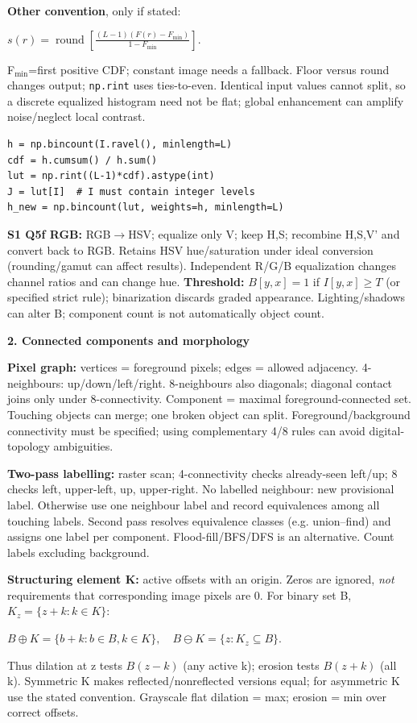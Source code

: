 \documentclass[a4paper]{article}
\newcommand{\key}[1]{\textbf{#1}}
\newcommand{\Topic}[1]{\par\vspace{1.7pt}\noindent
  {\fontsize{7.7}{8.0}\selectfont\bfseries #1}\par\vspace{0.3pt}}
\newcommand{\eq}[1]{\par\noindent\mbox{\(\displaystyle #1\)}\par}
\newcounter{sheet}
\newcounter{sheetcolumn}
\newlength{\colwidth}
\newenvironment{sheetcol}[1][7.0]{\stepcounter{sheetcolumn}
  \begin{lrbox}{\columnbox}\begin{minipage}[t]{\colwidth}\vspace{0pt}
  \fontsize{#1}{\dimexpr#1pt+0.6pt\relax}\selectfont}
  {\end{minipage}\end{lrbox}
  \typeout{CV1COL|\thesheet|\thesheetcolumn|\the\dimexpr\ht\columnbox+\dp\columnbox\relax}
  \usebox{\columnbox}\ignorespacesafterend}
\begin{document}
\begin{sheetcol}[6.45]
\key{Other convention}, only if stated:
\eq{s(r)=\operatorname{round}\!\left[\frac{(L-1)(F(r)-F_{\min})}{1-F_{\min}}\right].}
F\(_{\min}\)=first positive CDF; constant image needs a fallback. Floor versus round changes output; \texttt{np.rint} uses ties-to-even. Identical input values cannot split, so a discrete equalized histogram need not be flat; global enhancement can amplify noise/neglect local contrast.
\begin{lstlisting}
h = np.bincount(I.ravel(), minlength=L)
cdf = h.cumsum() / h.sum()
lut = np.rint((L-1)*cdf).astype(int)
J = lut[I]  # I must contain integer levels
h_new = np.bincount(lut, weights=h, minlength=L)
\end{lstlisting}
\key{S1 Q5f RGB:} RGB\(\to\)HSV; equalize only V; keep H,S; recombine H,S,V' and convert back to RGB. Retains HSV hue/saturation under ideal conversion (rounding/gamut can affect results). Independent R/G/B equalization changes channel ratios and can change hue.
\key{Threshold:} \(B[y,x]=1\) if \(I[y,x]\ge T\) (or specified strict rule); binarization discards graded appearance. Lighting/shadows can alter B; component count is not automatically object count.

\Topic{2. Connected components and morphology}
\key{Pixel graph:} vertices = foreground pixels; edges = allowed adjacency. 4-neighbours: up/down/left/right. 8-neighbours also diagonals; diagonal contact joins only under 8-connectivity. Component = maximal foreground-connected set. Touching objects can merge; one broken object can split. Foreground/background connectivity must be specified; using complementary 4/8 rules can avoid digital-topology ambiguities.

\key{Two-pass labelling:} raster scan; 4-connectivity checks already-seen left/up; 8 checks left, upper-left, up, upper-right. No labelled neighbour: new provisional label. Otherwise use one neighbour label and record equivalences among all touching labels. Second pass resolves equivalence classes (e.g. union--find) and assigns one label per component. Flood-fill/BFS/DFS is an alternative. Count labels excluding background.

\key{Structuring element K:} active offsets with an origin. Zeros are ignored, \emph{not} requirements that corresponding image pixels are 0. For binary set B, \(K_z=\{z+k:k\in K\}\):
\eq{B\oplus K=\{b+k:b\in B,k\in K\},\quad
 B\ominus K=\{z:K_z\subseteq B\}.}
Thus dilation at z tests \(B(z-k)\) (any active k); erosion tests \(B(z+k)\) (all k). Symmetric K makes reflected/nonreflected versions equal; for asymmetric K use the stated convention. Grayscale flat dilation = max; erosion = min over correct offsets.


\end{sheetcol}
\end{document}
